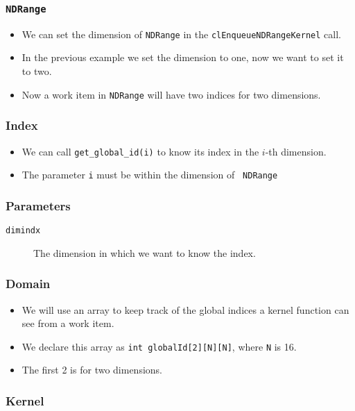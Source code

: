 \documentclass{beamer}
\begin{document}
\begin{frame}
  \frametitle{\tt NDRange} 
  \begin{itemize}
    \item We can set the dimension of {\tt NDRange} in the
      {\tt clEnqueueNDRangeKernel} call.
    \item In the previous example we set the dimension to one, now we
      want to set it to two.
    \item Now a work item in {\tt NDRange} will have two indices for
      two dimensions.
  \end{itemize}
\end{frame}

\begin{frame}
  \frametitle{Index}
  \begin{itemize}
    \item We can call {\tt get\_global\_id(i)} to know its index in
      the $i$-th dimension.
    \item The parameter {\tt i} must be within the dimension of {\tt
      NDRange}
  \end{itemize}
\end{frame}

\begin{frame}
\end{frame}

\begin{frame}
  \frametitle{Parameters}
  \begin{description}
  \item [\tt dimindx] The dimension in which we want to know the
    index.
  \end{description}
\end{frame}

\begin{frame}
  \frametitle{Domain}
  \begin{itemize}
    \item We will use an array to keep track of the global indices a
      kernel function can see from a work item.
      \item We declare this array as {\tt int globalId[2][N][N]},
        where {\tt N} is 16.
      \item The first 2 is for two dimensions.
  \end{itemize}
\end{frame}

\begin{frame}
  \frametitle{Kernel}
\end{frame}
\end{document}
